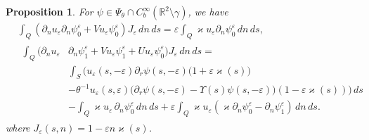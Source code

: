 \documentclass[reqno]{amsart}
\theoremstyle{plain}
\newtheorem{prop}{Proposition}
\numberwithin{equation}{section}
\renewcommand{\kappa}{\varkappa}
\newcommand{\Real}{\mathbb R}
\newcommand{\eps}{\varepsilon}
\begin{document}
\begin{prop}\label{PropIntomegaEps}
For $\psi\in \Psi_\theta\cap C_b^\infty(\Real^2\setminus \gamma)$, we have
  \begin{align}\label{IntInLocal1}
   &\int_Q (\partial_n u_\eps \partial_n \psi_0^\eps+Vu_\eps \psi_0^\eps)J_\eps\,dn\,ds=\eps \int_Q \kappa u_\eps \partial_n\psi_0^\eps\,dn\,ds,
    \\
   &\begin{aligned}\label{IntInLocal2}
    \int_Q (\partial_n u_\eps&\partial_n \psi_1^\eps+Vu_\eps \psi_1^\eps+Uu_\eps \psi_0^\eps)J_\eps\,dn\,ds=
    \\
    &\int_S \Big(u_\eps(s,-\eps)\partial_r \psi(s,-\eps)\big(1+\eps \kappa(s)\big)
    \\
    &-
    \theta^{-1}u_\eps(s,\eps)\big(\partial_r\psi(s,-\eps)-\Upsilon(s)\psi(s,-\eps)\big)(1-\eps \kappa(s))\Big)\,ds
    \\
&-\int_Q \kappa u_\eps\, \partial_n\psi_0^\eps\,dn\,ds+
\eps\int_Q \kappa u_\eps (\kappa \partial_n\psi_0^\eps- \partial_n \psi_1^\eps)\,dn\,ds.
    \end{aligned}
  \end{align}
  where $J_\eps(s,n)=1-\eps n \kappa(s)$.
\end{prop}
\end{document}
